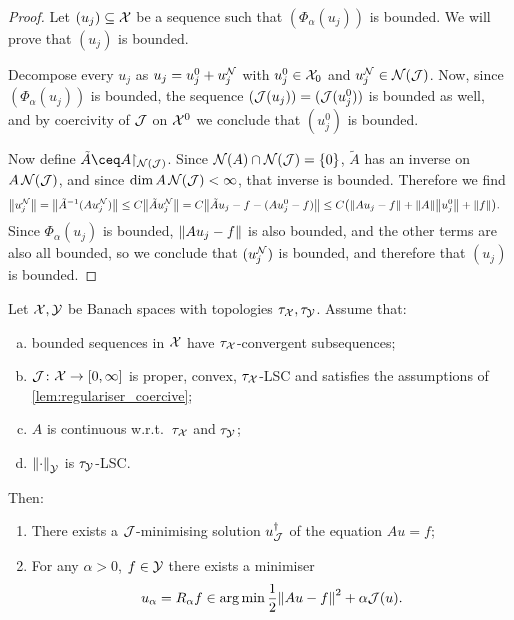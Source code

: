 \begin{proof}
	Let $(u_j) \subseteq \mathcal X$ be a sequence such that $(\Phi_\alpha(u_j))$ is bounded. We will prove that $(u_j)$ is bounded. 
	
	Decompose every $u_j$ as $u_j = u_j^0 + u_j^{\mathcal N}$ with $u_j^0 \in \mathcal X_0$ and $u_j^{\mathcal N} \in \operatorname{\mathcal N}(\mathcal J)$. Now, since $(\Phi_\alpha(u_j))$ is bounded, the sequence $(\mathcal J(u_j)) = (\mathcal J(u_j^0))$ is bounded as well, and by coercivity of $\mathcal J$ on $\mathcal X^0$ we conclude that $(u_j^0)$ is bounded. 
	
	Now define $\tilde A \ceq A\restr_{\Nul(\JJ)}$. Since $\operatorname{\mathcal N}(A) \cap \operatorname{\mathcal N}(\mathcal J) = \qty{0}$, $\tilde A$ has an inverse on $A \operatorname{\mathcal N}(\mathcal J)$, and since $\dim A\operatorname{\mathcal N}(\mathcal J) < \infty$, that inverse is bounded. Therefore we find
	\begin{align*}
		\norm{u_j^{\mathcal N}} &= \norm{\tilde A^{-1} ( A u_j^{\mathcal N})} \leq C \norm{\tilde A u_j^{\mathcal N}} = C \norm{\tilde A u_j - f - (A u_j^0 - f)} \leq C \qty(\norm{Au_j - f} + \norm{A} \norm{u_j^0} + \norm{f}). 
	\end{align*}
	Since $\Phi_\alpha(u_j)$ is bounded, $\norm{Au_j - f}$ is also bounded, and the other terms are also all bounded, so we conclude that $(u_j^{\mathcal N})$ is bounded, and therefore that $(u_j)$ is bounded. 
\end{proof}

\begin{theorem}
	Let $\mathcal X, \mathcal Y$ be Banach spaces with topologies $\tau_\mathcal X, \tau_\mathcal Y$. Assume that:
	\begin{enumerate}[(a)]
		\item bounded sequences in $\mathcal X$ have $\tau_\mathcal X$-convergent subsequences;
		\item $\mathcal J\colon \mathcal X \to [0, \infty]$ is proper, convex, $\tau_\mathcal X$-LSC and satisfies the assumptions of \cref{lem:regulariser_coercive};
		\item $A$ is continuous w.r.t.\ $\tau_\mathcal X$ and $\tau_\mathcal Y$;
		\item $\norm{\cdot}_\mathcal Y$ is $\tau_\mathcal Y$-LSC. 
	\end{enumerate}

Then:
\begin{enumerate}
	\item There exists a $\mathcal J$-minimising solution $u_\mathcal J^\dagger$ of the equation $Au = f$;
	\item For any $\alpha > 0$, $f \in \mathcal Y$ there exists a minimiser
	\[
 	u_\alpha = R_\alpha f \in \operatorname*{arg\,min} \frac12 \norm{Au - f}^2 + \alpha \mathcal J(u). 
	\]
\end{enumerate}
\end{theorem}

